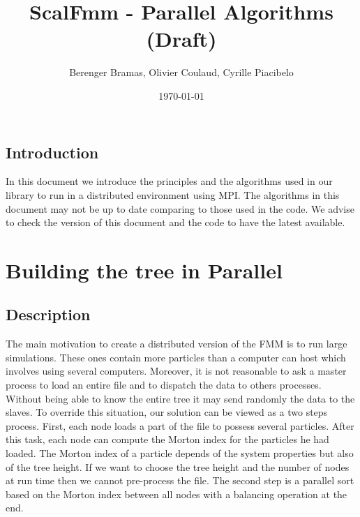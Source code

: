 \documentclass[12pt,letterpaper,titlepage]{report}
\author{Berenger Bramas, Olivier Coulaud, Cyrille Piacibelo}
\title{ScalFmm - Parallel Algorithms (Draft)}
\date{\today}
\begin{document}
\maketitle{}
\newpage
\tableofcontents
\newpage
\section{Introduction}
In this document we introduce the principles and the algorithms used
in our library to run in a distributed environment using MPI.  The
algorithms in this document may not be up to date comparing to those
used in the code.  We advise to check the version of this document and
the code to have the latest available.
\chapter{Building the tree in Parallel}
\section{Description}
The main motivation to create a distributed version of the FMM is to
run large simulations.  These ones contain more particles than a
computer can host which involves using several computers.  Moreover,
it is not reasonable to ask a master process to load an entire file
and to dispatch the data to others processes. Without being able to
know the entire tree it may send randomly the data to the slaves.  To
override this situation, our solution can be viewed as a two steps
process.  First, each node loads a part of the file to possess several
particles.  After this task, each node can compute the Morton index
for the particles he had loaded.  The Morton index of a particle
depends of the system properties but also of the tree height.  If we
want to choose the tree height and the number of nodes at run time
then we cannot pre-process the file.  The second step is a parallel
sort based on the Morton index between all nodes with a balancing
operation at the end.
\end{document}
